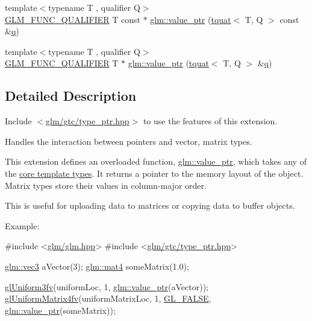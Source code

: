 \begin{DoxyCompactItemize}
\item 
{\footnotesize template$<$typename T , qualifier Q$>$ }\\\hyperlink{setup_8hpp_a33fdea6f91c5f834105f7415e2a64407}{G\+L\+M\+\_\+\+F\+U\+N\+C\+\_\+\+Q\+U\+A\+L\+I\+F\+I\+ER} T const  $\ast$ \hyperlink{group__gtc__type__ptr_ga8d5728b67f88d8fcce096db3885d74f0}{glm\+::value\+\_\+ptr} (\hyperlink{structglm_1_1tquat}{tquat}$<$ T, Q $>$ const \&\hyperlink{_s_d_l__opengl_8h_a8fc1e7b9baaae687804c7eed46ca09c6}{q})
\item 
{\footnotesize template$<$typename T , qualifier Q$>$ }\\\hyperlink{setup_8hpp_a33fdea6f91c5f834105f7415e2a64407}{G\+L\+M\+\_\+\+F\+U\+N\+C\+\_\+\+Q\+U\+A\+L\+I\+F\+I\+ER} T $\ast$ \hyperlink{group__gtc__type__ptr_ga38e914875e288a10c99139869be4426a}{glm\+::value\+\_\+ptr} (\hyperlink{structglm_1_1tquat}{tquat}$<$ T, Q $>$ \&\hyperlink{_s_d_l__opengl_8h_a8fc1e7b9baaae687804c7eed46ca09c6}{q})
\end{DoxyCompactItemize}


\subsection{Detailed Description}
Include $<$\hyperlink{type__ptr_8hpp}{glm/gtc/type\+\_\+ptr.\+hpp}$>$ to use the features of this extension.

Handles the interaction between pointers and vector, matrix types.

This extension defines an overloaded function, \hyperlink{group__gtc__type__ptr_ga1c64669e1ba1160ad9386e43dc57569a}{glm\+::value\+\_\+ptr}, which takes any of the \hyperlink{group__core__template}{core template types}. It returns a pointer to the memory layout of the object. Matrix types store their values in column-\/major order.

This is useful for uploading data to matrices or copying data to buffer objects.

Example\+: 
\begin{DoxyCode}
\textcolor{preprocessor}{#include <\hyperlink{glm_8hpp}{glm/glm.hpp}>}
\textcolor{preprocessor}{#include <\hyperlink{type__ptr_8hpp}{glm/gtc/type\_ptr.hpp}>}

\hyperlink{structglm_1_1vec}{glm::vec3} aVector(3);
\hyperlink{structglm_1_1mat}{glm::mat4} someMatrix(1.0);

\hyperlink{_s_d_l__opengles2__gl2_8h_a991515844544ee1e7f352b84664d81be}{glUniform3fv}(uniformLoc, 1, \hyperlink{group__gtc__type__ptr_ga1c64669e1ba1160ad9386e43dc57569a}{glm::value\_ptr}(aVector));
\hyperlink{_s_d_l__opengles2__gl2_8h_af5b4b100bbe8284da6f00415c9687d62}{glUniformMatrix4fv}(uniformMatrixLoc, 1, \hyperlink{glew_8h_abca6d43f43fae31f49dcb883b2f301f6}{GL\_FALSE}, 
      \hyperlink{group__gtc__type__ptr_ga1c64669e1ba1160ad9386e43dc57569a}{glm::value\_ptr}(someMatrix));
\end{DoxyCode}


